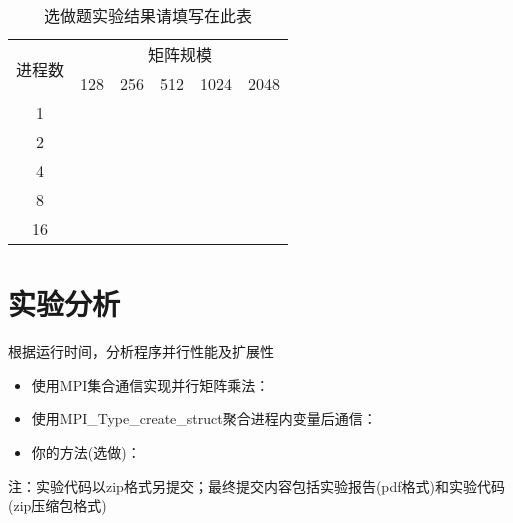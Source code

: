 \documentclass{SYSUReport}
\begin{document}
\begin{table}[H]
\centering
\caption{选做题实验结果请填写在此表}
\label{表3}
\begin{tabular}{|c|lllll|}
\hline
\multirow{2}{*}{进程数} & \multicolumn{5}{c|}{矩阵规模}                                                                        \\ \cline{2-6} 
 & \multicolumn{1}{l|}{128} & \multicolumn{1}{l|}{256} & \multicolumn{1}{l|}{512} & \multicolumn{1}{l|}{1024} & 2048 \\ \hline
1                    & \multicolumn{1}{l|}{} & \multicolumn{1}{l|}{} & \multicolumn{1}{l|}{} & \multicolumn{1}{l|}{} &  \\ \hline
2                    & \multicolumn{1}{l|}{} & \multicolumn{1}{l|}{} & \multicolumn{1}{l|}{} & \multicolumn{1}{l|}{} &  \\ \hline
4                    & \multicolumn{1}{l|}{} & \multicolumn{1}{l|}{} & \multicolumn{1}{l|}{} & \multicolumn{1}{l|}{} &  \\ \hline
8                    & \multicolumn{1}{l|}{} & \multicolumn{1}{l|}{} & \multicolumn{1}{l|}{} & \multicolumn{1}{l|}{} &  \\ \hline
16                   & \multicolumn{1}{l|}{} & \multicolumn{1}{l|}{} & \multicolumn{1}{l|}{} & \multicolumn{1}{l|}{} &  \\ \hline
\end{tabular}
\end{table}


\section{实验分析}
根据运行时间，分析程序并行性能及扩展性
\begin{itemize}
    \item 使用MPI集合通信实现并行矩阵乘法：
    \item 使用MPI\_Type\_create\_struct聚合进程内变量后通信：
    \item 你的方法(选做)：
\end{itemize}
注：实验代码以zip格式另提交；最终提交内容包括实验报告(pdf格式)和实验代码(zip压缩包格式)
\end{document}
